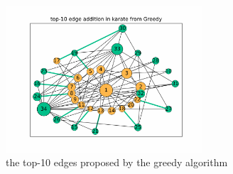\begin{figure}[!htbp]
	\centering
	\captionsetup{justification=centering,margin=2cm}
	\includegraphics[width=0.65\textwidth]{Figures/top-10_karate_greedy}
	\caption{the top-10 edges proposed by the greedy algorithm}
	\label{fig:top-10-karate}
\end{figure}

